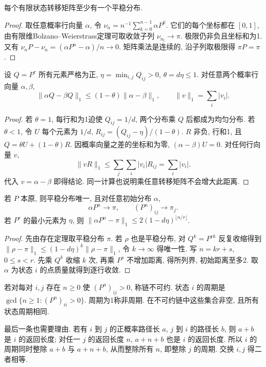 \begin{theorem}[有限链的平稳分布存在]
每个有限状态转移矩阵至少有一个平稳分布.
\end{theorem}
\begin{proof}
取任意概率行向量 $\alpha$, 令 $\nu_n=n^{-1}\sum_{k=0}^{n-1}\alpha P^k$. 它们的每个坐标都在 $[0,1]$, 由有限维Bolzano--Weierstrass定理可取收敛子列 $\nu_{n_l}\to\pi$. 极限仍非负且坐标和为1. 又有
$\nu_nP-\nu_n=(\alpha P^n-\alpha)/n\to0$.
矩阵乘法是连续的, 沿子列取极限得 $\pi P=\pi$.
\end{proof}
\begin{lemma}[正矩阵幂带来的收缩]
设 $Q=P^r$ 所有元素严格为正, $\eta=\min_{i,j}Q_{ij}>0$, $\theta=d\eta\leq1$. 对任意两个概率行向量 $\alpha,\beta$,
\[\|\alpha Q-\beta Q\|_1\leq(1-\theta)\|\alpha-\beta\|_1,\qquad \|v\|_1=\sum_i|v_i|.\]
\end{lemma}
\begin{proof}
若 $\theta=1$, 每行和为1迫使 $Q_{ij}=1/d$, 两个分布乘 $Q$ 后都成为均匀分布. 若 $\theta<1$, 令 $U$ 每个元素为 $1/d$, $R_{ij}=(Q_{ij}-\eta)/(1-\theta)$. $R$ 非负, 行和1, 且 $Q=\theta U+(1-\theta)R$. 因概率向量之差的坐标和为零, $(\alpha-\beta)U=0$. 对任何行向量 $v$,
\[\|vR\|_1\leq\sum_j\sum_i|v_i|R_{ij}=\sum_i|v_i|.\]
代入 $v=\alpha-\beta$ 即得结论. 同一计算也说明乘任意转移矩阵不会增大此距离.
\end{proof}
\begin{theorem}[本原有限链的收敛]
若 $P$ 本原, 则平稳分布唯一, 且对任意初始分布 $\alpha$,
\[\alpha P^n\to\pi,\qquad (P^n)_{ij}\to\pi_j.\]
若 $P^r$ 的最小元素为 $\eta$, 则
$\|\alpha P^n-\pi\|_1\leq2(1-d\eta)^{\lfloor n/r\rfloor}$.
\end{theorem}
\begin{proof}
先由存在定理取平稳分布 $\pi$. 若 $\rho$ 也是平稳分布, 对 $Q^k=P^{rk}$ 反复收缩得到
$\|\rho-\pi\|_1\leq(1-d\eta)^k\|\rho-\pi\|_1$, 令 $k\to\infty$ 得唯一性. 写 $n=kr+s$, $0\leq s<r$. 先乘 $Q^k$ 收缩 $k$ 次, 再乘 $P^s$ 不增加距离, 得所列界, 初始距离至多2. 取 $\alpha$ 为状态 $i$ 的点质量就得到逐行收敛.
\end{proof}

\begin{definition}
若对每对 $i,j$ 存在 $n\geq0$ 使 $(P^n)_{ij}>0$, 称链不可约. 状态 $i$ 的周期是
$\gcd\{n\geq1:(P^n)_{ii}>0\}$. 周期为1称非周期. 在不可约链中这些集合非空, 且所有状态周期相同.
\end{definition}
最后一条也需要理由. 若有 $i$ 到 $j$ 的正概率路径长 $a$, $j$ 到 $i$ 的路径长 $b$, 则 $a+b$ 是 $i$ 的返回长度; 对任一 $j$ 的返回长度 $n$, $a+n+b$ 也是 $i$ 的返回长度. 所以 $i$ 的周期同时整除 $a+b$ 与 $a+n+b$, 从而整除所有 $n$, 即整除 $j$ 的周期. 交换 $i,j$ 得二者相等.

